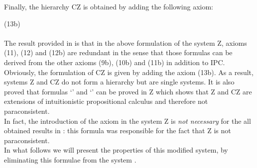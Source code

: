 \documentclass{llncs}
\begin{document}
\noindent Finally, the hierarchy CZ is obtained by adding the
following axiom:

\vskip3pt

\noindent (13b) \ \ \ \\\\
The result provided in \cite{OmWa10} is that in the above
formulation of the system Z, axioms (11), (12) and (12b) are
redundant in the sense that those formulas can be derived from the
other axioms (9b), (10b) and (11b) in addition to IPC.
Obviously, the formulation of CZ is given by adding the axiom
(13b). As a result, systems Z and CZ do not form a hierarchy
but are single systems. It is also proved that formulas
`' and
`' can be proved in Z which
shows that Z and CZ are extensions of intuitionistic
propositional calculus and therefore not
paraconsistent.\\
In fact, the introduction of the axiom  in the
system Z is \emph{not necessary} for the all obtained results in
\cite{Majk08dc}: this formula was responsible for the fact that
Z is not paraconsistent.\\
In what follows we will present the properties of this modified
system, by eliminating this formulae from the system .
\end{document}
